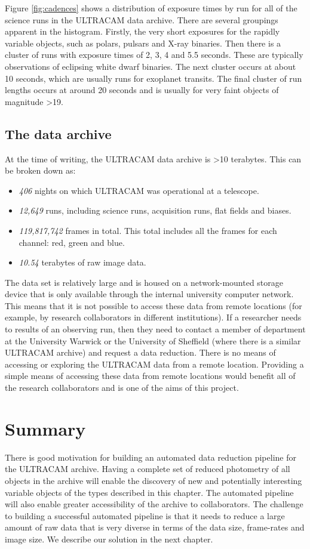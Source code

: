 Figure \ref{fig:cadences} shows a distribution of exposure times by run for all of the science runs in the ULTRACAM data archive. There are several groupings apparent in the histogram. Firstly, the very short exposures for the rapidly variable objects, such as polars, pulsars and X-ray binaries. Then there is a cluster of runs with exposure times of 2, 3, 4 and 5.5 seconds. These are typically observations of eclipsing white dwarf binaries. The next cluster occurs at about 10 seconds, which are usually runs for exoplanet transits. The final cluster of run lengths occurs at around 20 seconds and is usually for very faint objects of magnitude \textgreater 19.

\subsection{The data archive}
At the time of writing, the ULTRACAM data archive is \textgreater 10 terabytes. This can be broken down as:
\begin{itemize}
	\item \emph{406} nights on which ULTRACAM was operational at a telescope.
	\item \emph{12,649} runs, including science runs, acquisition runs, flat fields and biases. 
	\item \emph{119,817,742} frames in total. This total includes all the frames for each channel: red, green and blue.
	\item \emph{10.54} terabytes of raw image data.
\end{itemize} 

The data set is relatively large and is housed on a network-mounted storage device that is only available through the internal university computer network. This means that it is not possible to access these data from remote locations (for example, by research collaborators in different institutions). If a researcher needs to results of an observing run, then they need to contact a member of department at the University Warwick or the University of Sheffield (where there is a similar ULTRACAM archive) and request a data reduction. There is no means of accessing or exploring the ULTRACAM data from a remote location. Providing a simple means of accessing these data from remote locations would benefit all of the research collaborators and is one of the aims of this project.

\section{Summary}
There is good motivation for building an automated data reduction pipeline for the ULTRACAM archive. Having a complete set of reduced photometry of all objects in the archive will enable the discovery of new and potentially interesting variable objects of the types described in this chapter. The automated pipeline will also enable greater accessibility of the archive to collaborators. The challenge to building a successful automated pipeline is that it needs to reduce a large amount of raw data that is very diverse in terms of the data size, frame-rates and image size. We describe our solution in the next chapter. 